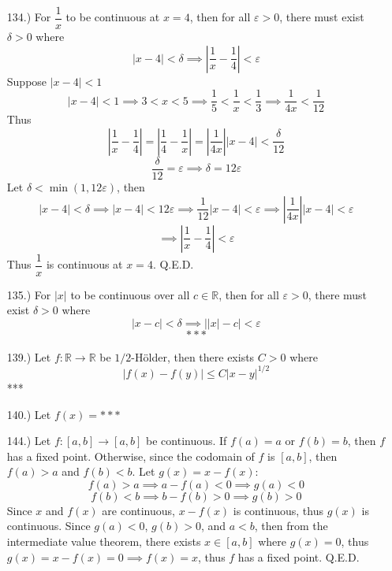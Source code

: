 \documentclass[12pt]{article}
\newcommand{\vertb}[1]{\left\vert#1\right\vert}
\newcommand{\e}{\varepsilon}
\begin{document}
\begin{itemize}
    \item [134.)] For $\dfrac{1}{x}$ to be continuous at $x=4$, then for all $\e>0$, there must exist $\delta>0$ where
    \[\vertb{x-4}<\delta\implies\vertb{\frac{1}{x}-\frac{1}{4}}<\e\]
    Suppose $\vertb{x-4}<1$
    \[\vertb{x-4}<1\implies3<x<5\implies\frac{1}{5}<\frac{1}{x}<\frac{1}{3}\implies\frac{1}{4x}<\frac{1}{12}\]
    Thus
    \[\vertb{\frac{1}{x}-\frac{1}{4}}=\vertb{\frac{1}{4}-\frac{1}{x}}=\vertb{\frac{1}{4x}}\vertb{x-4}<\frac{\delta}{12}\]
    \[\frac{\delta}{12}=\e\implies\delta=12\e\]
    Let $\delta<\min(1,12\e)$, then
    \[\vertb{x-4}<\delta\implies\vertb{x-4}<12\e\implies \frac{1}{12}\vertb{x-4}<\e\implies\vertb{\frac{1}{4x}}\vertb{x-4}<\e\]
    \[\implies \vertb{\frac{1}{x}-\frac{1}{4}}<\e\]
    Thus $\dfrac{1}{x}$ is continuous at $x=4$. Q.E.D.

    \item [135.)] For $\vertb{x}$ to be continuous over all $c\in\mathbb{R}$, then for all $\e>0$, there must exist $\delta>0$ where
    \[\vertb{x-c}<\delta\implies\big\vert{\vertb{x}-c}\big\vert<\e\]
    \[***\]



 
    \item [139.)] Let $f:\mathbb R\to\mathbb R$ be $1/2$-H\"older, then there exists $C>0$ where
    \[\vertb{f(x)-f(y)}\leq C\vertb{x-y}^{1/2}\]
    ***

    \item [140.)] Let $f(x)=***$




    \item [144.)] Let $f:[a,b]\to[a,b]$ be continuous. If $f(a)=a$ or $f(b)=b$, then $f$ has a fixed point. Otherwise, since the codomain of $f$ is $[a,b]$, then $f(a)>a$ and $f(b)<b$. Let $g(x)=x-f(x)$:
    \[f(a)>a\implies a-f(a)<0\implies g(a)<0\]
    \[f(b)<b\implies b-f(b)>0\implies g(b)>0\]
    Since $x$ and $f(x)$ are continuous, $x-f(x)$ is continuous, thus $g(x)$ is continuous. Since $g(a)<0$, $g(b)>0$, and $a<b$, then from the intermediate value theorem, there exists $x\in[a,b]$ where $g(x)=0$, thus $g(x)=x-f(x)=0\implies f(x)=x$, thus $f$ has a fixed point. Q.E.D.


\end{itemize}
\end{document}
